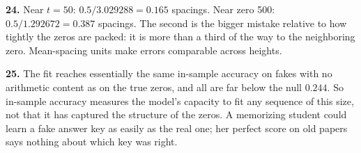 \textbf{24.} Near $t=50$: $0.5/3.029288 = 0.165$ spacings. Near zero 500: $0.5/1.292672 = 0.387$ spacings. The second is the bigger mistake relative to how tightly the zeros are packed: it is more than a third of the way to the neighboring zero. Mean-spacing units make errors comparable across heights.

\textbf{25.} The fit reaches essentially the same in-sample accuracy on fakes with no arithmetic content as on the true zeros, and all are far below the null $0.244$. So in-sample accuracy measures the model's capacity to fit any sequence of this size, not that it has captured the structure of the zeros. A memorizing student could learn a fake answer key as easily as the real one; her perfect score on old papers says nothing about which key was right.
